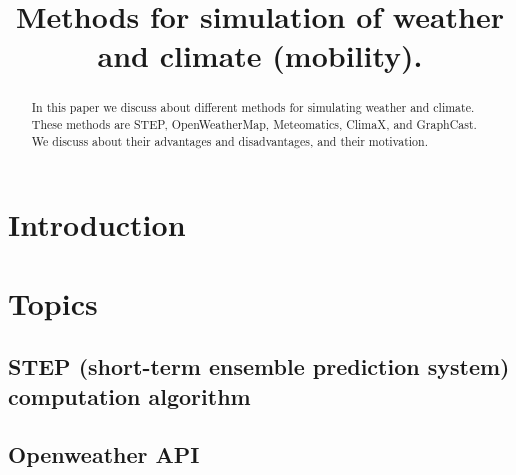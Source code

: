 \documentclass[conference]{IEEEtran}
\begin{document}
\title{Methods for simulation of weather and climate
(mobility).\\}

\author{
\and
{}
}

\maketitle

\begin{abstract}
    In this paper we discuss about different methods for simulating weather and climate.
    These methods are STEP, OpenWeatherMap, Meteomatics, ClimaX, and GraphCast.
    We discuss about their advantages and disadvantages, and their motivation.
\end{abstract}

\section{Introduction}\label{sec:introduction}


\section{Topics}\label{sec:topics}

\subsection{STEP (short-term ensemble prediction system) computation algorithm}\label{subsec:step-(short-term-ensemble-prediction-system)-computation-algorithm}


\subsection{Openweather API}\label{subsec:openweather-api}

\end{document}
